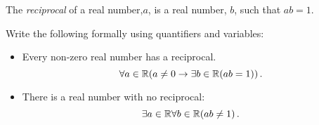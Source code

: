 \guard




\begin{exmp}
\label{exmp:reciprocal}
  The \emph{reciprocal} of a real number,$a$, is a real number, $b$, such that $ab=1$.

  Write the following formally using quantifiers and variables:
  \begin{itemize}
    \item Every non-zero real number has a reciprocal.\\
      \[ \forall a\in\mathbb{R}( a\not=0\rightarrow\exists b\in\mathbb{R}(ab=1))\,.\]
    \item There is a real number with no reciprocal:
      \[\exists a\in\mathbb{R}\forall b\in\mathbb{R}(ab\not=1)\,.\]
  \end{itemize}
\end{exmp}
